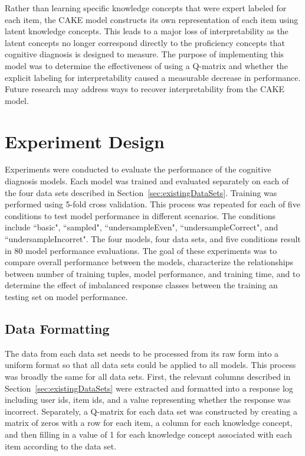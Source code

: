 \documentclass[letterpaper, 12pt, captions=tableabove]{scrreprt}
\begin{document}
		Rather than learning specific knowledge concepts that were expert labeled for each item, the CAKE model constructs its own representation of each item using latent knowledge concepts. This leads to a major loss of interpretability as the latent concepts no longer correspond directly to the proficiency concepts that cognitive diagnosis is designed to measure. The purpose of implementing this model was to determine the effectiveness of using a Q-matrix and whether the explicit labeling for interpretability caused a measurable decrease in performance. Future research may address ways to recover interpretability from the CAKE model.

	\section{Experiment Design}
	\label{sec:experimentDesign}

		Experiments were conducted to evaluate the performance of the cognitive diagnosis models. Each model was trained and evaluated separately on each of the four data sets described in Section~\ref{sec:existingDataSets}. Training was performed using 5-fold cross validation. This process was repeated for each of five conditions to test model performance in different scenarios. The conditions include ``basic", ``sampled", ``undersampleEven", ``undersampleCorrect", and ``undersampleIncorret".  The four models, four data sets, and five conditions result in 80 model performance evaluations. The goal of these experiments was to compare overall performance between the models, characterize the relationships between number of training tuples, model performance, and training time, and to determine the effect of imbalanced response classes between the training an testing set on model performance.

		\subsection{Data Formatting}
		\label{sub:dataFormatting}
			The data from each data set needs to be processed from its raw form into a uniform format so that all data sets could be applied to all models. This process was broadly the same for all data sets. First, the relevant columns described in Section~\ref{sec:existingDataSets} were extracted and formatted into a response log including user ids, item ids, and a value representing whether the response was incorrect. Separately, a Q-matrix for each data set was constructed by creating a matrix of zeros with a row for each item, a column for each knowledge concept, and then filling in a value of 1 for each knowledge concept associated with each item according to the data set. 
\end{document}
